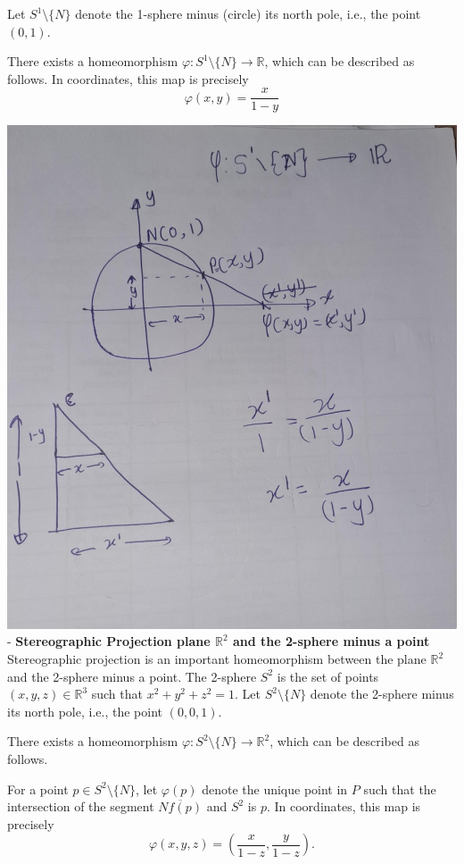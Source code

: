 \documentclass[
]{book}
\theoremstyle{definition}
\theoremstyle{definition}
\theoremstyle{definition}
\theoremstyle{definition}
\theoremstyle{remark}
\begin{document}
Let \(S^1 \setminus \{N\}\) denote the 1-sphere minus (circle) its north pole, i.e., the point \((0,1)\).

There exists a homeomorphism \(\varphi : S^1 \setminus \{N\} \to \mathbb{R}\), which can be described as follows. In coordinates, this map is precisely
\[\varphi(x,y) = \frac{x}{1-y}\]

\includegraphics{figures/ch1/fig05.jpg}
- \textbf{Stereographic Projection plane \(\mathbb{R}^2\) and the 2-sphere minus a point}\\

Stereographic projection is an important homeomorphism between the plane \(\mathbb{R}^2\) and the 2-sphere minus a point. The 2-sphere \(S^2\) is the set of points \((x,y,z) \in \mathbb{R}^3\) such that \(x^2 + y^2 + z^2 = 1\). Let \(S^2 \setminus \{N\}\) denote the 2-sphere minus its north pole, i.e., the point \((0,0,1)\).

There exists a homeomorphism \(\varphi : S^2 \setminus \{N\} \to \mathbb{R}^2\), which can be described as follows.

For a point \(p \in S^2 \setminus \{N\}\), let \(\varphi(p)\) denote the unique point in \(P\) such that the intersection of the segment \(\overline{Nf(p)}\) and \(S^2\) is \(p\). In coordinates, this map is precisely
\[\varphi(x,y,z) = \left(\frac{x}{1-z}, \frac{y}{1-z}\right).\]
\end{document}
